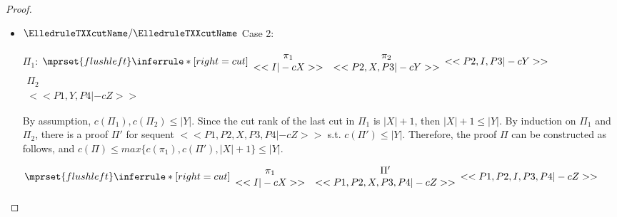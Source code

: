 \begin{proof}
\begin{enumerate}
\begin{itemize}
    \item $\ElledruleTXXcutName/\ElledruleTXXcutName$ Case 2:
      \begin{center}
        \scriptsize
        $\Pi_1$:
        \begin{math}
          $$\mprset{flushleft}
          \inferrule* [right={\tiny cut}] {
            {
              \begin{array}{cc}
                \pi_1 & \pi_2 \\
                {<<I |-c X>>} & {<<P2, X, P3 |-c Y>>}
              \end{array}
            }
          }{<<P2, I, P3 |-c Y>>}
        \end{math}
        \qquad\qquad
        \begin{math}
          \begin{array}{c}
            \Pi_2 \\
            {<<P1, Y, P4 |-c Z>>}
          \end{array}
        \end{math}
      \end{center}
      By assumption, $c(\Pi_1),c(\Pi_2)\leq |Y|$. Since the cut rank of the last cut in
      $\Pi_1$ is $|X|+1$, then $|X|+1\leq |Y|$. By induction on $\Pi_1$ and $\Pi_2$, there is
      a proof $\Pi'$ for sequent $<<P1, P2, X, P3, P4 |-c Z>>$ s.t. $c(\Pi')\leq|Y|$.
      Therefore, the proof $\Pi$ can be constructed as follows, and
      $c(\Pi)\leq max\{c(\pi_1),c(\Pi'),|X|+1\}\leq |Y|$.
      \begin{center}
        \scriptsize
        \begin{math}
          $$\mprset{flushleft}
          \inferrule* [right={\tiny cut}] {
            {
              \begin{array}{cc}
                \pi_1 & \Pi' \\
                {<<I |-c X>>} & {<<P1, P2, X, P3, P4 |-c Z>>}
              \end{array}
            }
          }{<<P1, P2, I, P3, P4 |-c Z>>}
        \end{math}
      \end{center}


\end{itemize}
\end{enumerate}
\end{proof}
